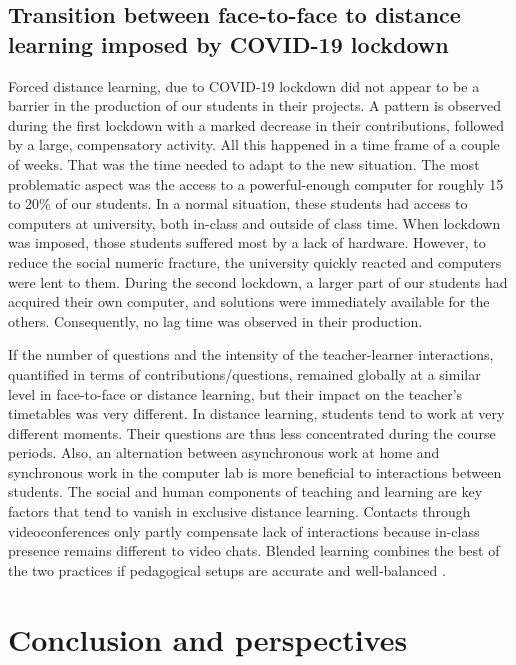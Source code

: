 \documentclass{aims}
\theoremstyle{definition}
\begin{document}
\hypertarget{transition-between-face-to-face-to-distance-learning-imposed-by-covid-19-lockdown-2}{%
\subsection{Transition between face-to-face to distance learning imposed
by COVID-19
lockdown}\label{transition-between-face-to-face-to-distance-learning-imposed-by-covid-19-lockdown-2}}

Forced distance learning, due to COVID-19 lockdown did not appear to be
a barrier in the production of our students in their projects. A pattern
is observed during the first lockdown with a marked decrease in their
contributions, followed by a large, compensatory activity. All this
happened in a time frame of a couple of weeks. That was the time needed
to adapt to the new situation. The most problematic aspect was the
access to a powerful-enough computer for roughly 15 to 20\% of our
students. In a normal situation, these students had access to computers
at university, both in-class and outside of class time. When lockdown
was imposed, those students suffered most by a lack of hardware.
However, to reduce the social numeric fracture, the university quickly
reacted and computers were lent to them. During the second lockdown, a
larger part of our students had acquired their own computer, and
solutions were immediately available for the others. Consequently, no
lag time was observed in their production.

If the number of questions and the intensity of the teacher-learner
interactions, quantified in terms of contributions/questions, remained
globally at a similar level in face-to-face or distance learning, but
their impact on the teacher's timetables was very different. In distance
learning, students tend to work at very different moments. Their
questions are thus less concentrated during the course periods. Also, an
alternation between asynchronous work at home and synchronous work in
the computer lab is more beneficial to interactions between students.
The social and human components of teaching and learning are key factors
that tend to vanish in exclusive distance learning. Contacts through
videoconferences only partly compensate lack of interactions because
in-class presence remains different to video chats. Blended learning
combines the best of the two practices if pedagogical setups are
accurate and well-balanced \cite{Bernard2014}.

\hypertarget{conclusion-and-perspectives}{%
\section{Conclusion and
perspectives}\label{conclusion-and-perspectives}}
\end{document}
